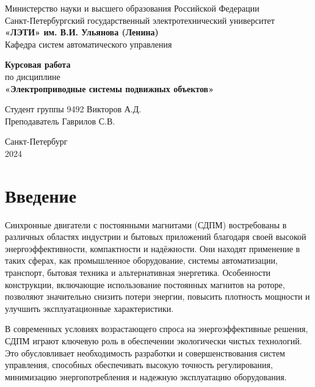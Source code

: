 \documentclass[a4paper,14pt]{extarticle} %
\begin{document}
\begin{titlepage}
    \begin{center}
        \large
        Министерство науки и высшего образования Российской Федерации \\
        Санкт-Петербургский государственный электротехнический университет \\
        \textbf{«ЛЭТИ» им. В.И. Ульянова (Ленина)} \\
        Кафедра систем автоматического управления

        \vfill

        \textbf{Курсовая работа} \\
        по дисциплине \\
        \textbf{«Электроприводные системы подвижных объектов»}

        \vfill

        Студент группы 9492 \hfill Викторов А.Д. \\
        Преподаватель \hfill Гаврилов С.В.

        \vfill
        Санкт-Петербург \\
        2024
    \end{center}
\end{titlepage}

\setcounter{page}{2}

\newpage

\section*{Введение}

Синхронные двигатели с постоянными магнитами (СДПМ) востребованы в различных областях индустрии и бытовых приложений благодаря своей высокой энергоэффективности, компактности и надёжности. Они находят применение в таких сферах, как промышленное оборудование, системы автоматизации, транспорт, бытовая техника и альтернативная энергетика. Особенности конструкции, включающие использование постоянных магнитов на роторе, позволяют значительно снизить потери энергии, повысить плотность мощности и улучшить эксплуатационные характеристики.

В современных условиях возрастающего спроса на энергоэффективные решения, СДПМ играют ключевую роль в обеспечении экологически чистых технологий. Это обусловливает необходимость разработки и совершенствования систем управления, способных обеспечивать высокую точность регулирования, минимизацию энергопотребления и надежную эксплуатацию оборудования.
\end{document}
